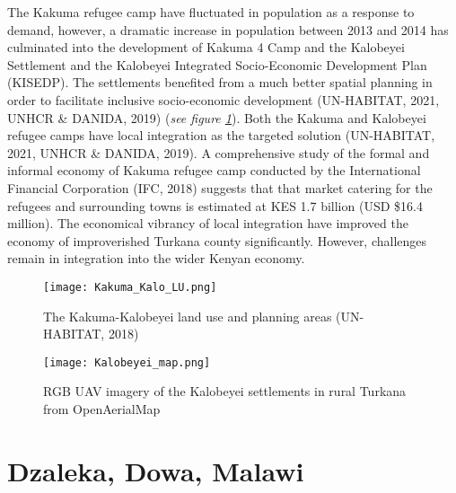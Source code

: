 \documentclass[11pt, a4paper, twoside]{report}
\begin{document}
The Kakuma refugee camp have fluctuated in population as a response to demand, however, a dramatic increase in population between 2013 and 2014 has culminated into the development of Kakuma 4 Camp and the Kalobeyei Settlement and the Kalobeyei Integrated Socio-Economic Development Plan (KISEDP). The settlements benefited from a much better spatial planning in order to facilitate inclusive socio-economic development (UN-HABITAT, 2021, UNHCR \& DANIDA, 2019) (\textit{see figure \ref{fig:KU_KALO_LU}}). Both the Kakuma and Kalobeyei refugee camps have local integration as the targeted solution (UN-HABITAT, 2021, UNHCR \& DANIDA, 2019). A comprehensive study of the formal and informal economy of Kakuma refugee camp conducted by the International Financial Corporation (IFC, 2018) suggests that that market catering for the refugees and surrounding towns is estimated at KES 1.7 billion (USD \$16.4 million). The economical vibrancy of local integration have improved the economy of improverished Turkana county significantly. However, challenges remain in integration into the wider Kenyan economy.\\\par

\begin{figure}[H]
  \centering
  \texttt{[image: Kakuma\_Kalo\_LU.png]}
  \caption{The Kakuma-Kalobeyei land use and planning areas (UN-HABITAT, 2018)}
  \label{fig:KU_KALO_LU}
\end{figure}

\begin{figure}[H]
  \centering
  \texttt{[image: Kalobeyei\_map.png]}
  \caption{RGB UAV imagery of the Kalobeyei settlements in rural Turkana from OpenAerialMap}
  \label{fig:KBY_overview}
\end{figure}

\section{Dzaleka, Dowa, Malawi}\label{Dzaleka}
\end{document}

